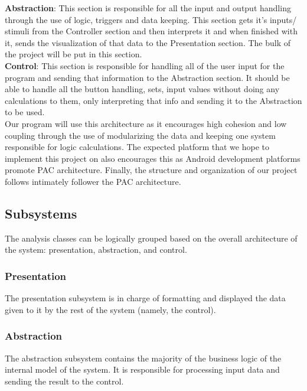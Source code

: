 \documentclass[]{article}
\begin{document}
\textbf{Abstraction}: This section is responsible for all the input and output
handling through the use of logic, triggers and data keeping. This section gets it’s
inputs/ stimuli from the Controller section and then interprets it and when finished
with it, sends the visualization of that data to the Presentation section. The bulk
of the project will be put in this section. \\

\textbf{Control}: This section is responsible for handling all of the user input
for the program and sending that information to the Abstraction section. It should
be able to handle all the button handling, sets, input values without doing any
calculations to them, only interpreting that info and sending it to the Abstraction to be used. \\

Our program will use this architecture as it encourages high cohesion and low coupling
through the use of modularizing the data and keeping one system responsible for logic calculations.
The expected platform that we hope to implement this project on also encourages this as
Android development platforms promote PAC architecture. Finally, the structure and
organization of our project follows intimately follower the PAC architecture.


\subsection{Subsystems}
\label{sub:subsystems}

The analysis classes can be logically grouped based on the overall architecture
of the system: presentation, abstraction, and control.

\subsubsection{Presentation}

The presentation subsystem is in charge of formatting and displayed the data given
to it by the rest of the system (namely, the control).

\subsubsection{Abstraction}

The abstraction subsystem contains the majority of the business logic of the
internal model of the system. It is responsible for processing input data and
sending the result to the control.
\end{document}
